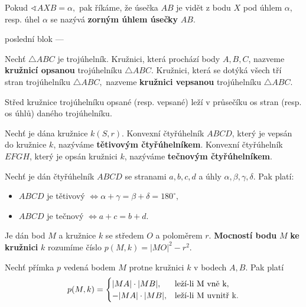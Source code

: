 \begin{pozn}
  Pokud $\sphericalangle AXB = \alpha,$ pak říkáme, že úsečka $AB$ je vidět z bodu $X$ pod úhlem $\alpha$, resp. úhel $\alpha$ se nazývá \textbf{zorným úhlem úsečky} $AB.$
\end{pozn}

poslední blok ---
\begin{definition}
  Nechť $\triangle ABC$ je trojúhelník. Kružnici, která prochází body $A,B,C$, nazveme \textbf{kružnicí opsanou} trojúhelníku $\triangle ABC.$ Kružnici, která se dotýká všech tří stran trojúhelníku $\triangle ABC,$ nazveme \textbf{kružnici vepsanou} trojúhelníku $\triangle ABC.$
\end{definition}

\begin{veta}
  Střed kružnice trojúhelníku opsané (resp. vepsané) leží v průsečíku os stran (resp. os úhlů) daného trojúhelníku.
\end{veta}

\begin{definition}
  Nechť je dána kružnice $k(S,r).$ Konvexní čtyřúhelník $ABCD$, který je vepsán do kružnice $k$, nazýváme \textbf{tětivovým čtyřúhelníkem}. Konvexní čtyřúhelník $EFGH$, který je opsán kružnici $k$, nazýváme \textbf{tečnovým čtyřúhelníkem}.
\end{definition}

\begin{veta}
  Nechť je dán čtyřúhelník $ABCD$ se stranami $a,b,c,d$ a úhly $\alpha, \beta, \gamma, \delta.$ Pak platí:
  \begin{itemize}
    \item $ABCD$ je tětivový $\iff \alpha + \gamma=\beta+\delta=180^\circ,$
    \item $ABCD$ je tečnový $\iff a+c=b+d.$
  \end{itemize}
\end{veta}

\begin{definition}
  Je dán bod $M$ a kružnice $k$ se středem $O$ a poloměrem $r$. \textbf{Mocností bodu} $M$ \textbf{ke kružnici} $k$ rozumíme číslo $p(M, k) = |MO|^2-r^2.$
\end{definition}

\begin{veta}
  Nechť přímka $p$ vedená bodem $M$ protne kružnici $k$ v bodech $A,B$. Pak platí
  \[
    p(M,k)=
    \begin{cases}
      |MA|\cdot |MB|, & \text{leží-li } $M$ \text{ vně } $k$, \\
      -|MA|\cdot |MB|, & \text{leží-li } $M$ \text{ uvnitř } $k$.
    \end{cases}
  \]
\end{veta}


